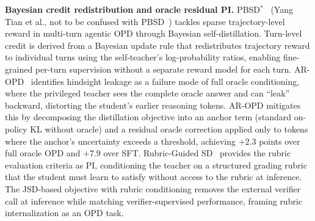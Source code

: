 \documentclass{article} %
\begin{document}
\textbf{Bayesian credit redistribution and oracle residual PI.} PBSD$^*$~\citep{2606.09348} (Yang Tian et al., not to be confused with PBSD~\citep{2605.05040}) tackles sparse trajectory-level reward in multi-turn agentic OPD through Bayesian self-distillation. Turn-level credit is derived from a Bayesian update rule that redistributes trajectory reward to individual turns using the self-teacher's log-probability ratios, enabling fine-grained per-turn supervision without a separate reward model for each turn. AR-OPD~\citep{2606.10385} identifies hindsight leakage as a failure mode of full oracle conditioning, where the privileged teacher sees the complete oracle answer and can ``leak'' backward, distorting the student's earlier reasoning tokens. AR-OPD mitigates this by decomposing the distillation objective into an anchor term (standard on-policy KL without oracle) and a residual oracle correction applied only to tokens where the anchor's uncertainty exceeds a threshold, achieving $+2.3$ points over full oracle OPD and $+7.9$ over SFT. Rubric-Guided SD~\citep{2606.12507} provides the rubric evaluation criteria as PI, conditioning the teacher on a structured grading rubric that the student must learn to satisfy without access to the rubric at inference. The JSD-based objective with rubric conditioning removes the external verifier call at inference while matching verifier-supervised performance, framing rubric internalization as an OPD task.
\end{document}
